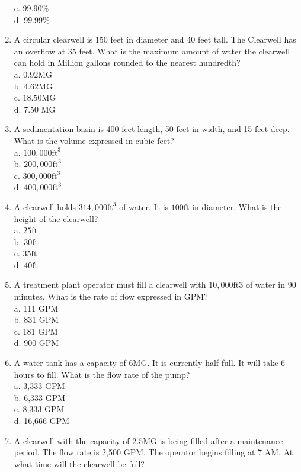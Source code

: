 \begin{enumerate}
c. $99.90 \%$\\
d. $99.99 \%$\\
\item A circular clearwell is 150 feet in diameter and 40 feet tall. The Clearwell has an overflow at 35 feet. What is the maximum amount of water the clearwell can hold in Million gallons rounded to the nearest hundredth?\\
a. $0.92 \mathrm{MG}$\\
b. $4.62 \mathrm{MG}$\\
c. $18.50 \mathrm{MG}$\\
d. 7.50 MG\\
\item A sedimentation basin is 400 feet length, 50 feet in width, and 15 feet deep. What is the volume expressed in cubic feet?\\
a. $100,000 \mathrm{ft}^{3}$\\
b. $200,000 \mathrm{ft}^{3}$\\
c. $300,000 \mathrm{ft}^{3}$\\
d. $400,000 \mathrm{ft}^{3}$\\
\item A clearwell holds $314,000 \mathrm{ft}^{3}$ of water. It is $100 \mathrm{ft}$ in diameter. What is the height of the clearwell?\\
a. $25 \mathrm{ft}$\\
b. $30 \mathrm{ft}$\\
c. $35 \mathrm{ft}$\\
d. $40 \mathrm{ft}$\\
\item A treatment plant operator must fill a clearwell with $10,000 \mathrm{ft} 3$ of water in 90 minutes. What is the rate of flow expressed in GPM?\\
a. 111 GPM\\
b. 831 GPM\\
c. 181 GPM\\
d. 900 GPM\\
\item A water tank has a capacity of 6MG. It is currently half full. It will take 6 hours to fill. What is the flow rate of the pump?\\
a. 3,333 GPM\\
b. 6,333 GPM\\
c. 8,333 GPM\\
d. 16,666 GPM\\
\item A clearwell with the capacity of $2.5 \mathrm{MG}$ is being filled after a maintenance period. The flow rate is 2,500 GPM. The operator begins filling at 7 AM. At what time will the clearwell be full?\\

\end{enumerate}
